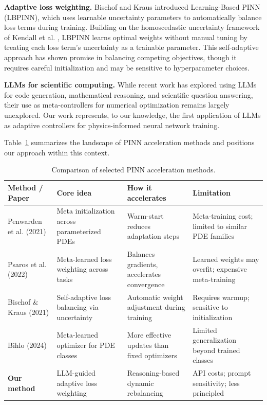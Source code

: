 \documentclass{article}
\begin{document}
\textbf{Adaptive loss weighting.} Bischof and Kraus \citep{Bischof2021LBPINN} introduced Learning-Based PINN (LBPINN), which uses learnable uncertainty parameters to automatically balance loss terms during training. Building on the homoscedastic uncertainty framework of Kendall et al. \citep{Kendall2017}, LBPINN learns optimal weights without manual tuning by treating each loss term's uncertainty as a trainable parameter. This self-adaptive approach has shown promise in balancing competing objectives, though it requires careful initialization and may be sensitive to hyperparameter choices.

\textbf{LLMs for scientific computing.} While recent work has explored using LLMs for code generation, mathematical reasoning, and scientific question answering, their use as meta-controllers for numerical optimization remains largely unexplored. Our work represents, to our knowledge, the first application of LLMs as adaptive controllers for physics-informed neural network training.

Table~\ref{table:comparison} summarizes the landscape of PINN acceleration methods and positions our approach within this context.

\begin{table}[htbp]
\caption{Comparison of selected PINN acceleration methods.}
\label{table:comparison}
\begin{center}
\small
\begin{tabular}{p{2.2cm}p{2.8cm}p{2.8cm}p{3.0cm}}
\toprule
\textbf{Method / Paper} & \textbf{Core idea} & \textbf{How it accelerates} & \textbf{Limitation} \\
\midrule
Penwarden et al. (2021) & Meta initialization across parameterized PDEs & Warm-start reduces adaptation steps & Meta-training cost; limited to similar PDE families \\
\midrule
Psaros et al. (2022) & Meta-learned loss weighting across tasks & Balances gradients, accelerates convergence & Learned weights may overfit; expensive meta-training \\
\midrule
Bischof \& Kraus (2021) & Self-adaptive loss balancing via uncertainty & Automatic weight adjustment during training & Requires warmup; sensitive to initialization \\
\midrule
Bihlo (2024) & Meta-learned optimizer for PDE classes & More effective updates than fixed optimizers & Limited generalization beyond trained classes \\
\midrule
\textbf{Our method} & LLM-guided adaptive loss weighting & Reasoning-based dynamic rebalancing & API costs; prompt sensitivity; less principled \\
\bottomrule
\end{tabular}
\end{center}
\end{table}
\end{document}
